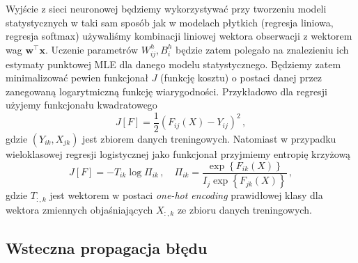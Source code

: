 \documentclass{myclass}
\begin{document}
Wyjście z sieci neuronowej będziemy wykorzystywać przy tworzeniu modeli statystycznych w taki sam
sposób jak w modelach płytkich (regresja liniowa, regresja softmax) używaliśmy kombinacji liniowej
wektora obserwacji z wektorem wag \(\mathbf{w}^\top\mathbf{x}\). Uczenie parametrów \(W_{ij}^h,
B_i^h\) będzie zatem polegało na znalezieniu ich estymaty punktowej MLE dla danego modelu
statystycznego. Będziemy zatem minimalizować pewien funkcjonał \(J\) (funkcję kosztu) o postaci
danej przez zanegowaną logarytmiczną funkcję wiarygodności. Przykładowo dla regresji użyjemy
funkcjonału kwadratowego
\begin{equation*}
    J[F] = \frac{1}{2}\left(F_{ij}(X) - Y_{ij}\right)^2\,,
\end{equation*}
gdzie \((Y_{ik}, X_{jk})\) jest zbiorem danych treningowych. Natomiast w przypadku wieloklasowej
regresji logistycznej jako funkcjonał przyjmiemy entropię krzyżową
\begin{equation*}
    J[F] = -T_{ik}\log \Pi_{ik}\,,\quad \Pi_{ik} = \frac{\exp\left\{F_{ik}(X)\right\}}{I_j\exp\left\{F_{jk}(X)\right\}}\,,
\end{equation*}
gdzie \(T_{:,k}\) jest wektorem w postaci \textit{one-hot encoding} prawidłowej klasy dla wektora
zmiennych objaśniających \(X_{:,k}\) ze zbioru danych treningowych.

\subsection{Wsteczna propagacja błędu}
\end{document}
